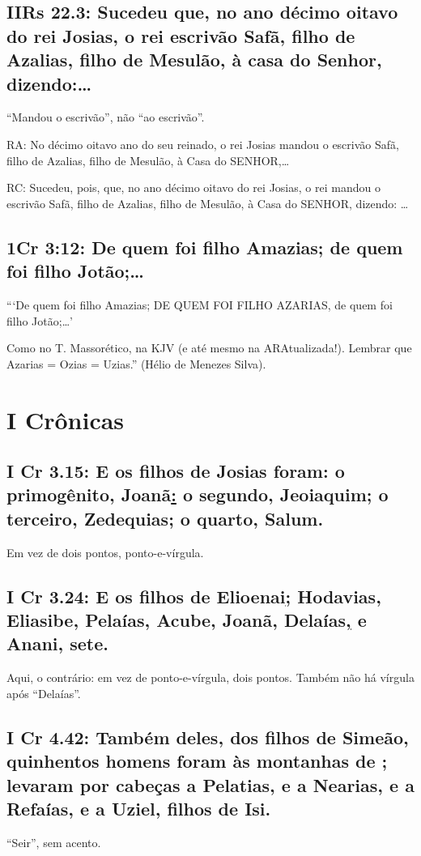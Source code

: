 \subsection{IIRs 22.3: Sucedeu que, no ano décimo oitavo do rei Josias, o rei  escrivão Safã, filho de Azalias, filho de Mesulão, à casa do Senhor, dizendo:\ldots}
``Mandou o escrivão'', não ``ao escrivão''.

RA: No décimo oitavo ano do seu reinado, o rei Josias mandou o escrivão Safã, filho de Azalias, filho de Mesulão, à Casa do SENHOR,\ldots

RC: Sucedeu, pois, que, no ano décimo oitavo do rei Josias, o rei mandou o escrivão Safã, filho de Azalias, filho de Mesulão, à Casa do SENHOR, dizendo: \ldots

\subsection{1Cr 3:12: De quem foi filho Amazias; de quem foi filho Jotão;\ldots}

```De quem foi filho Amazias; DE QUEM FOI FILHO AZARIAS, de quem foi filho Jotão;\ldots'

Como no T. Massorético, na KJV (e até mesmo na ARAtualizada!). Lembrar que Azarias = Ozias = Uzias.'' (Hélio de Menezes Silva).

\section{I Crônicas}
\subsection{I Cr 3.15: E os filhos de Josias foram: o primogênito, Joanã\uline{:} o segundo, Jeoiaquim; o terceiro, Zedequias; o quarto, Salum.}
Em vez de dois pontos, ponto-e-vírgula.

\subsection{I Cr 3.24: E os filhos de Elioenai\uline{;} Hodavias, Eliasibe, Pelaías, Acube, Joanã, Delaías\uline{,} e Anani, sete.}
Aqui, o contrário: em vez de ponto-e-vírgula, dois pontos. Também não
há vírgula após ``Delaías''.

\subsection{I Cr 4.42: Também deles, dos filhos de Simeão, quinhentos homens foram às montanhas de ; levaram por cabeças a Pelatias, e a Nearias, e a Refaías, e a Uziel, filhos de Isi.}
``Seir'', sem acento.

